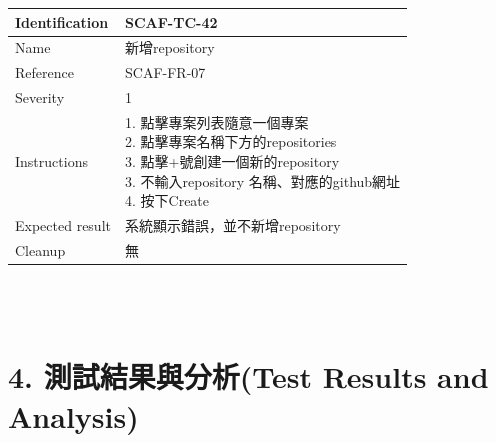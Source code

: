 \documentclass{report}
\begin{document}
\begin{tabularx}{\textwidth}{
  |p{}%
  |p{}|%
  }
  \hline
  \centering Identification &  SCAF-TC-42 \\
  \hline
  \centering Name & 新增repository \\
  \hline
  \centering Reference & SCAF-FR-07 \\
  \hline
  \centering Severity & 1 \\
  \hline
  \centering Instructions & 
  \makecell[l]{
    1. 點擊專案列表隨意一個專案 \\
    2. 點擊專案名稱下方的repositories \\
    3. 點擊+號創建一個新的repository \\
    3. 不輸入repository 名稱、對應的github網址  \\
    4. 按下Create
  }\\
  \hline
  \centering Expected result & 系統顯示錯誤，並不新增repository \\
  \hline
  \centering Cleanup & 無 \\
  \hline
\end{tabularx}
\\
\newline
\\
\section*{4. 測試結果與分析(Test Results and Analysis)}
\end{document}
